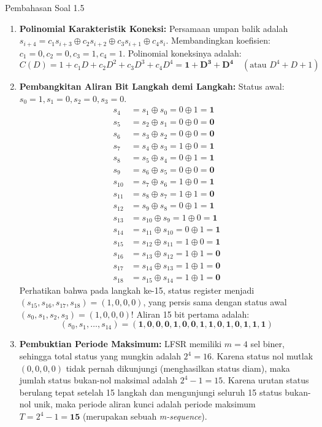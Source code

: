 \documentclass[11pt,a4paper]{article}
\begin{document}
\begin{solusibox}{Pembahasan Soal 1.5}
\begin{enumerate}[leftmargin=*]
    \item \textbf{Polinomial Karakteristik Koneksi:}
    Persamaan umpan balik adalah $s_{i+4} = c_1 s_{i+3} \oplus c_2 s_{i+2} \oplus c_3 s_{i+1} \oplus c_4 s_i$.
    Membandingkan koefisien: $c_1 = 0, c_2 = 0, c_3 = 1, c_4 = 1$.
    Polinomial koneksinya adalah:
    \[
    C(D) = 1 + c_1 D + c_2 D^2 + c_3 D^3 + c_4 D^4 = \mathbf{1 + D^3 + D^4} \quad (\text{atau } D^4 + D + 1)
    \]
    \item \textbf{Pembangkitan Aliran Bit Langkah demi Langkah:}
    Status awal: $s_0 = 1, s_1 = 0, s_2 = 0, s_3 = 0$.
    \begin{align*}
    s_4 &= s_1 \oplus s_0 = 0 \oplus 1 = \mathbf{1} \\
    s_5 &= s_2 \oplus s_1 = 0 \oplus 0 = \mathbf{0} \\
    s_6 &= s_3 \oplus s_2 = 0 \oplus 0 = \mathbf{0} \\
    s_7 &= s_4 \oplus s_3 = 1 \oplus 0 = \mathbf{1} \\
    s_8 &= s_5 \oplus s_4 = 0 \oplus 1 = \mathbf{1} \\
    s_9 &= s_6 \oplus s_5 = 0 \oplus 0 = \mathbf{0} \\
    s_{10} &= s_7 \oplus s_6 = 1 \oplus 0 = \mathbf{1} \\
    s_{11} &= s_8 \oplus s_7 = 1 \oplus 1 = \mathbf{0} \\
    s_{12} &= s_9 \oplus s_8 = 0 \oplus 1 = \mathbf{1} \\
    s_{13} &= s_{10} \oplus s_9 = 1 \oplus 0 = \mathbf{1} \\
    s_{14} &= s_{11} \oplus s_{10} = 0 \oplus 1 = \mathbf{1} \\
    s_{15} &= s_{12} \oplus s_{11} = 1 \oplus 0 = \mathbf{1} \\
    s_{16} &= s_{13} \oplus s_{12} = 1 \oplus 1 = \mathbf{0} \\
    s_{17} &= s_{14} \oplus s_{13} = 1 \oplus 1 = \mathbf{0} \\
    s_{18} &= s_{15} \oplus s_{14} = 1 \oplus 1 = \mathbf{0}
    \end{align*}
    Perhatikan bahwa pada langkah ke-15, status register menjadi $(s_{15}, s_{16}, s_{17}, s_{18}) = (1, 0, 0, 0)$, yang persis sama dengan status awal $(s_0, s_1, s_2, s_3) = (1, 0, 0, 0)$!
    Aliran 15 bit pertama adalah:
    \[
    (s_0, s_1, \dots, s_{14}) = \mathbf{(1, 0, 0, 0, 1, 0, 0, 1, 1, 0, 1, 0, 1, 1, 1)}
    \]
    \item \textbf{Pembuktian Periode Maksimum:}
    LFSR memiliki $m = 4$ sel biner, sehingga total status yang mungkin adalah $2^4 = 16$. Karena status nol mutlak $(0, 0, 0, 0)$ tidak pernah dikunjungi (menghasilkan status diam), maka jumlah status bukan-nol maksimal adalah $2^4 - 1 = 15$.
    Karena urutan status berulang tepat setelah 15 langkah dan mengunjungi seluruh 15 status bukan-nol unik, maka periode aliran kunci adalah periode maksimum $T = 2^4 - 1 = \mathbf{15}$ (merupakan sebuah \textit{m-sequence}).
\end{enumerate}
\end{solusibox}
\end{document}

